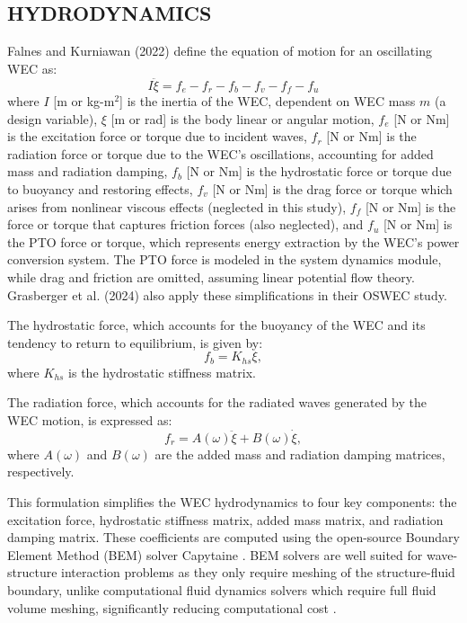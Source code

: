 \documentclass[twocolumn,10pt]{asme2e}
\begin{document}
\subsection{HYDRODYNAMICS} \label{sec:hydro}
Falnes and Kurniawan (2022) \cite{falnes2022} define the equation of motion for an oscillating WEC as:
\begin{equation}
    \label{eq:wec}
    I\ddot{\xi} = f_e - f_r - f_b - f_v - f_f - f_u  
\end{equation}
\noindent where $I$ [m or kg-m$^2$] is the inertia of the WEC, dependent on WEC mass $m$ (a design variable), $\xi$ [m or rad] is the body linear or angular motion, $f_e$ [N or Nm] is the excitation force or torque due to incident waves, $f_r$ [N or Nm] is the radiation force or torque due to the WEC’s oscillations, accounting for added mass and radiation damping, $f_b$ [N or Nm] is the hydrostatic force or torque due to buoyancy and restoring effects, $f_v$ [N or Nm] is the drag force or torque which arises from nonlinear viscous effects (neglected in this study), $f_f$ [N or Nm] is the force or torque that captures friction forces (also neglected), and $f_u$ [N or Nm] is the PTO force or torque, which represents energy extraction by the WEC’s power conversion system. The PTO force is modeled in the system dynamics module, while drag and friction are omitted, assuming linear potential flow theory. Grasberger et al. (2024) \cite{Grasberger2024} also apply these simplifications in their OSWEC study. 

The hydrostatic force, which accounts for the buoyancy of the WEC and its tendency to return to equilibrium, is given by: 
\begin{equation}
    \label{eq:hydrostatic}
    f_{b} = K_{hs} \xi,
\end{equation}
\noindent where $K_{hs}$ is the hydrostatic stiffness matrix.

The radiation force, which accounts for the radiated waves generated by the WEC motion, is expressed as:
\begin{equation}
    \label{eq:radiation}
    f_r = A(\omega) \ddot{\xi} + B(\omega) \dot{\xi},
\end{equation}
\noindent where $A(\omega)$ and $B(\omega)$ are the added mass and radiation damping matrices, respectively.

This formulation simplifies the WEC hydrodynamics to four key components: the excitation force, hydrostatic stiffness matrix, added mass matrix, and radiation damping matrix. These coefficients are computed using the open-source Boundary Element Method (BEM) solver Capytaine \cite{ancellin_capytaine_2019}. BEM solvers are well suited for wave-structure interaction problems as they only require meshing of the structure-fluid boundary, unlike computational fluid dynamics solvers which require full fluid volume meshing, significantly reducing computational cost \cite{bem_wave}.
\end{document}
